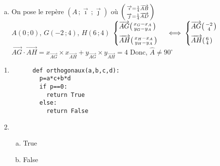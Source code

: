 \documentclass[12pt, a4paper]{article}
\begin{document}
\begin{Exercise}[number={74}]
  \begin{enumerate}[a)]
   \item On pose le repère $(A\, ;\overrightarrow{\imath}\,;\overrightarrow{\jmath})$ où $\begin{psmallmatrix}\overrightarrow{\imath}=\frac{1}{4}\overrightarrow{AB}\\\overrightarrow{\jmath}=\frac{1}{4}\overrightarrow{AD}\end{psmallmatrix}$ \smallskip \\
    $A(0\,;0)$, $G(-2\,;4)$, $H(6\,;4)$ \medbreak
    $\begin{cases}\overrightarrow{AG}\begin{psmallmatrix}x_G-x_A\\y_G-y_A\end{psmallmatrix}\\[0.2cm]\overrightarrow{AH}\begin{psmallmatrix}x_H-x_A\\y_H-y_A\end{psmallmatrix}\end{cases} \iff\begin{cases}\overrightarrow{AG}\begin{psmallmatrix}-2\\4\end{psmallmatrix}\\[0.2cm]\overrightarrow{AH}\begin{psmallmatrix}6\\4\end{psmallmatrix}\end{cases}$ \medbreak
    $\overrightarrow{AG}\cdot\overrightarrow{AH}=x_{\overrightarrow{AG}}\times x_{\overrightarrow{AH}}+y_{\overrightarrow{AG}}\times y_{\overrightarrow{AH}}=4$ \qquad Donc, $\widehat{A}\neq 90^{\circ}$
  \end{enumerate}
\end{Exercise}

\begin{Exercise}[number={78}]
  \begin{enumerate}[1)]
    \item \begin{verbatim}
      def orthogonaux(a,b,c,d):
        p=a*c+b*d
        if p==0:
          return True
        else:
          return False
    \end{verbatim}
    \item \begin{enumerate}[a)]
          \item True
          \item False
          \end{enumerate}
  \end{enumerate}
\end{Exercise}
\end{document}
